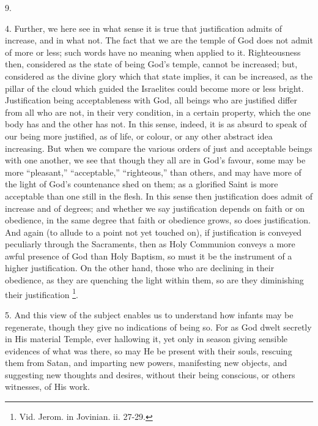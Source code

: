 9.

4. Further, we here see in what sense it is true that justification
admits of increase, and in what not. The fact that we are the temple
of God does not admit of more or less; such words have no meaning when
applied to it. Righteousness then, considered as the state of being
God's temple, cannot be increased; but, considered as the divine glory
which that state implies, it can be increased, as the pillar of the
cloud which guided the Israelites could become more or less bright.
Justification being acceptableness with God, all beings who are
justified differ from all who are not, in their very condition, in a
certain property, which the one body has and the other has not. In
this sense, indeed, it is as absurd to speak of our being more
justified, as of life, or colour, or any other abstract idea
increasing. But when we compare the various orders of just and
acceptable beings with one another, we see that though they all are in God's favour, some may be more ``pleasant,''
``acceptable,'' ``righteous,'' than others, and may
have more of the light of God's countenance shed on them; as a
glorified Saint is more acceptable than one still in the flesh. In
this sense then justification does admit of increase and of degrees;
and whether we say justification depends on faith or on obedience, in
the same degree that faith or obedience grows, so does justification.
And again (to allude to a point not yet touched on), if justification
is conveyed peculiarly through the Sacraments, then as Holy Communion
conveys a more awful presence of God than Holy Baptism, so must it be
the instrument of a higher justification. On the other hand, those who
are declining in their obedience, as they are quenching the light
within them, so are they diminishing their justification \footnote{Vid. Jerom. in
Jovinian. ii. 27-29.}.

5. And this view of the subject enables us to understand how
infants may be regenerate, though they give no indications of being
so. For as God dwelt secretly in His material Temple, ever hallowing
it, yet only in season giving sensible evidences of what was there, so
may He be present with their souls, rescuing them from Satan, and
imparting new powers, manifesting new objects, and suggesting new
thoughts and desires, without their being conscious, or others
witnesses, of His work.

